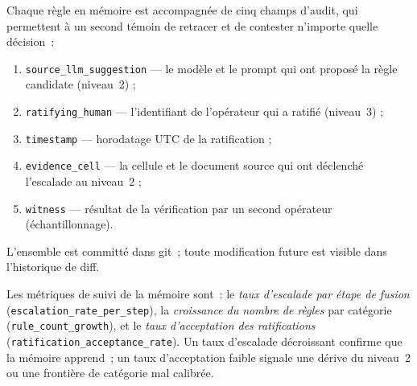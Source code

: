 Chaque règle en mémoire est accompagnée de cinq champs d'audit, qui
permettent à un second témoin de retracer et de contester n'importe quelle
décision~:

\begin{enumerate}
\item \texttt{source\_llm\_suggestion} --- le modèle et le prompt qui ont
  proposé la règle candidate (niveau~2) ;
\item \texttt{ratifying\_human} --- l'identifiant de l'opérateur qui a
  ratifié (niveau~3) ;
\item \texttt{timestamp} --- horodatage UTC de la ratification ;
\item \texttt{evidence\_cell} --- la cellule et le document source qui ont
  déclenché l'escalade au niveau~2 ;
\item \texttt{witness} --- résultat de la vérification par un second
  opérateur (échantillonnage).
\end{enumerate}

\noindent L'ensemble est committé dans git~; toute modification future est
visible dans l'historique de diff.

Les métriques de suivi de la mémoire sont~: le \emph{taux d'escalade par
étape de fusion} (\texttt{escalation\_rate\_per\_step}), la \emph{croissance
du nombre de règles} par catégorie (\texttt{rule\_count\_growth}), et le
\emph{taux d'acceptation des ratifications}
(\texttt{ratification\_acceptance\_rate}). Un taux d'escalade décroissant
confirme que la mémoire apprend~; un taux d'acceptation faible signale une
dérive du niveau~2 ou une frontière de catégorie mal calibrée.
